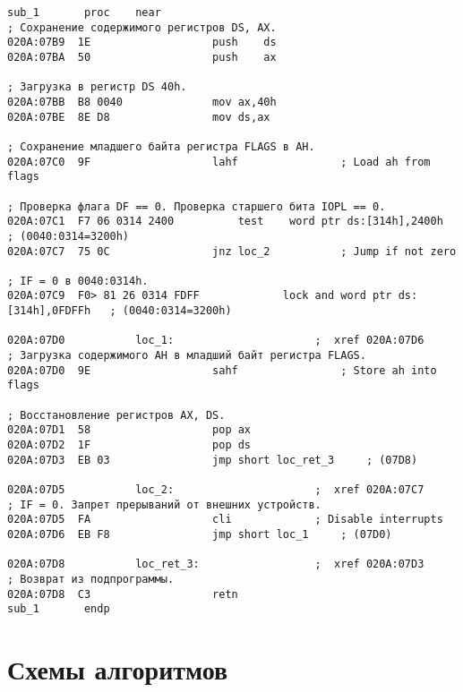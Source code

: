 \begin{lstlisting}[style={asm}]
			   sub_1       proc    near
; Сохранение содержимого регистров DS, AX.
020A:07B9  1E					push	ds
020A:07BA  50					push	ax

; Загрузка в регистр DS 40h.
020A:07BB  B8 0040				mov	ax,40h
020A:07BE  8E D8				mov	ds,ax

; Сохранение младшего байта регистра FLAGS в AH.
020A:07C0  9F					lahf				; Load ah from flags

; Проверка флага DF == 0. Проверка старшего бита IOPL == 0.
020A:07C1  F7 06 0314 2400			test	word ptr ds:[314h],2400h	; (0040:0314=3200h)
020A:07C7  75 0C				jnz	loc_2			; Jump if not zero

; IF = 0 в 0040:0314h.
020A:07C9  F0> 81 26 0314 FDFF	           lock	and	word ptr ds:[314h],0FDFFh	; (0040:0314=3200h)

020A:07D0			loc_1:						;  xref 020A:07D6
; Загрузка содержимого AH в младший байт регистра FLAGS. 
020A:07D0  9E					sahf				; Store ah into flags

; Восстановление регистров AX, DS.
020A:07D1  58					pop	ax
020A:07D2  1F					pop	ds
020A:07D3  EB 03				jmp	short loc_ret_3		; (07D8)

020A:07D5			loc_2:						;  xref 020A:07C7
; IF = 0. Запрет прерываний от внешних устройств.
020A:07D5  FA					cli				; Disable interrupts
020A:07D6  EB F8				jmp	short loc_1		; (07D0)

020A:07D8			loc_ret_3:					;  xref 020A:07D3
; Возврат из подпрограммы.
020A:07D8  C3					retn
sub_1       endp
\end{lstlisting}

\clearpage

\section*{Схемы алгоритмов}

%
%





\clearpage

